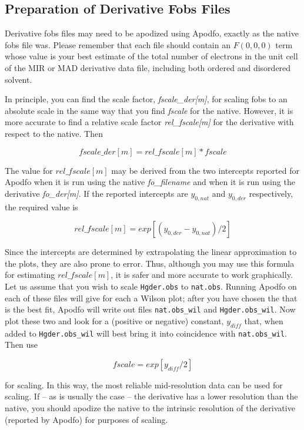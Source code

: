 \documentclass{report}
\begin{document}
\subsection {Preparation of Derivative Fobs Files}
\label{mir-preparation-derivative}

Derivative fobs files may need to be apodized
using Apodfo, exactly as the native
fobs file was.  Please remember that each file should contain an $F(0,0,0)$
term whose value is your best estimate of
the total number of electrons in the unit cell of the 
MIR or MAD derivative data file, including both ordered and disordered solvent.

In principle, you can find the scale factor, {\it fscale\_der[m]}, 
for scaling fobs to an absolute scale
in the same way that you find {\it fscale} for the native.  
However, it is more accurate to find a relative scale factor 
{\it rel\_fscale[m]} for the derivative with respect to the native.  Then

$$ fscale\_der[m] = rel\_fscale[m] * fscale $$

The value for $rel\_fscale[m]$ may be derived from the two intercepts
reported for Apodfo when it is run using the native {\it fo\_filename}
and when it is run using the derivative {\it fo\_der[m]}.  
If the reported intercepts are
$y_{0,nat}$ and $y_{0,der}$ respectively, the required value is

$$ rel\_fscale[m] = exp[(y_{0,der} - y_{0,nat}) / 2]$$

Since the intercepts are determined by extrapolating the linear approximation
to the plots, they are also prone to error.  Thus,
although you may use this formula for estimating $rel\_fscale[m]$, 
it is safer and more accurate to work graphically.  
Let us assume that you wish to scale 
{\tt Hgder.obs} to {\tt nat.obs}.  
Running Apodfo on each of these files will give for each a 
Wilson plot;
after you have chosen the \delfo that is
the best fit, Apodfo will write out files {\tt nat.obs\_wil} and
{\tt Hgder.obs\_wil}.
Now plot these two and look for a (positive or negative) constant, 
$y_{diff}$ that, when added to {\tt Hgder.obs\_wil} 
will best bring it into coincidence with {\tt nat.obs\_wil}.
Then use

$$ fscale = exp[y_{diff} / 2] $$

for scaling.  In this way, the most reliable mid-resolution data
can be used for scaling.  If -- as is usually the case -- the derivative
has a lower resolution than the native, you should apodize the native to the intrinsic
resolution of the derivative (reported by Apodfo) for purposes of scaling.
\end{document}
